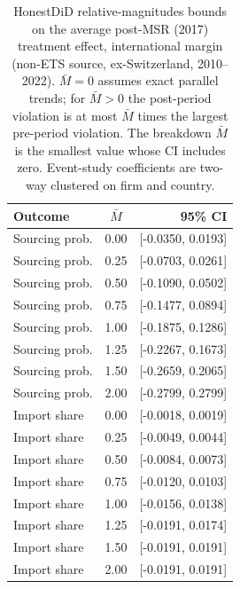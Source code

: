 \begin{table}[ht]
\centering
\caption{HonestDiD relative-magnitudes bounds on the average post-MSR (2017) treatment effect, international margin (non-ETS source, ex-Switzerland, 2010--2022). $\bar{M}=0$ assumes exact parallel trends; for $\bar{M}>0$ the post-period violation is at most $\bar{M}$ times the largest pre-period violation. The breakdown $\bar{M}$ is the smallest value whose CI includes zero. Event-study coefficients are two-way clustered on firm and country.} 
\label{tab:cdgm_honestdid_bounds}
\begin{tabular}{lcr}
  \toprule
Outcome & $\bar{M}$ & 95\% CI \\ 
  \midrule
Sourcing prob. & 0.00 & [-0.0350, 0.0193] \\ 
  Sourcing prob. & 0.25 & [-0.0703, 0.0261] \\ 
  Sourcing prob. & 0.50 & [-0.1090, 0.0502] \\ 
  Sourcing prob. & 0.75 & [-0.1477, 0.0894] \\ 
  Sourcing prob. & 1.00 & [-0.1875, 0.1286] \\ 
  Sourcing prob. & 1.25 & [-0.2267, 0.1673] \\ 
  Sourcing prob. & 1.50 & [-0.2659, 0.2065] \\ 
  Sourcing prob. & 2.00 & [-0.2799, 0.2799] \\ 
  Import share & 0.00 & [-0.0018, 0.0019] \\ 
  Import share & 0.25 & [-0.0049, 0.0044] \\ 
  Import share & 0.50 & [-0.0084, 0.0073] \\ 
  Import share & 0.75 & [-0.0120, 0.0103] \\ 
  Import share & 1.00 & [-0.0156, 0.0138] \\ 
  Import share & 1.25 & [-0.0191, 0.0174] \\ 
  Import share & 1.50 & [-0.0191, 0.0191] \\ 
  Import share & 2.00 & [-0.0191, 0.0191] \\ 
   \bottomrule
\end{tabular}
\end{table}
